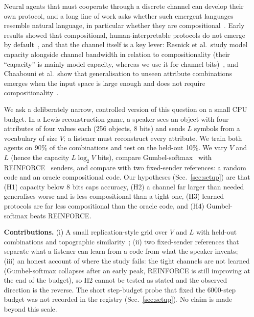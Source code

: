Neural agents that must cooperate through a discrete channel can develop their own protocol, and a long line of work asks whether such emergent languages resemble natural language, in particular whether they are compositional~\cite{lazaridou2016multi,havrylov2017emergence,lazaridou2020emergent}. Early results showed that compositional, human-interpretable protocols do not emerge by default~\cite{kottur2017natural}, and that the channel itself is a key lever: Resnick et al.\ study model capacity alongside channel bandwidth in relation to compositionality (their ``capacity'' is mainly model capacity, whereas we use it for channel bits)~\cite{resnick2019capacity}, and Chaabouni et al.\ show that generalisation to unseen attribute combinations emerges when the input space is large enough and does not require compositionality~\cite{chaabouni2020compositionality}.

We ask a deliberately narrow, controlled version of this question on a small CPU budget. In a Lewis reconstruction game, a speaker sees an object with four attributes of four values each (256 objects, 8 bits) and sends $L$ symbols from a vocabulary of size $V$; a listener must reconstruct every attribute. We train both agents on 90\% of the combinations and test on the held-out 10\%. We vary $V$ and $L$ (hence the capacity $L\log_2 V$ bits), compare Gumbel-softmax~\cite{jang2016categorical,maddison2016concrete} with REINFORCE~\cite{williams1992simple} senders, and compare with two fixed-sender references: a random code and an oracle compositional code. Our hypotheses (Sec.~\ref{sec:setup}) are that (H1) capacity below 8 bits caps accuracy, (H2) a channel far larger than needed generalises worse and is less compositional than a tight one, (H3) learned protocols are far less compositional than the oracle code, and (H4) Gumbel-softmax beats REINFORCE.

\textbf{Contributions.} (i) A small replication-style grid over $V$ and $L$ with held-out combinations and topographic similarity~\cite{brighton2006understanding}; (ii) two fixed-sender references that separate what a listener can learn from a code from what the speaker invents; (iii) an honest account of where the study fails: the tight channels are not learned (Gumbel-softmax collapses after an early peak, REINFORCE is still improving at the end of the budget), so H2 cannot be tested as stated and the observed direction is the reverse. The short step-budget probe that fixed the 6000-step budget was not recorded in the registry (Sec.~\ref{sec:setup}). No claim is made beyond this scale.
